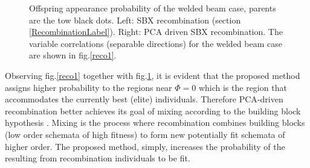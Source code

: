\begin{figure}[h!]
\begin{minipage}[b]{0.5\linewidth}
 \centering
\end{minipage}
\begin{minipage}[b]{0.5\linewidth}
 \centering
\end{minipage}
\caption{Offspring appearance probability of the welded beam case, parents are the tow black dots. Left: SBX recombination (section \ref{RecombinationLabel}). Right: PCA driven SBX recombination. The variable correlations (separable directions) for the welded beam case are shown in fig.\ref{reco1}.} 
\label{reco2}
\end{figure}

Observing fig.\ref{reco1} together with fig.\ref{reco2}, it is evident that the proposed method assigns higher probability to the regions near $\Phi=0$ which is the region that accommodates the currently best (elite) individuals. Therefore PCA-driven recombination better achieves its goal of mixing according to the building block hypothesis \cite{Gold89}. Mixing is the process where recombination combines building blocks (low order schemata of high fitness) to form new potentially fit schemata of higher order. The proposed method, simply, increases the probability of the resulting from recombination individuals to be fit.   

